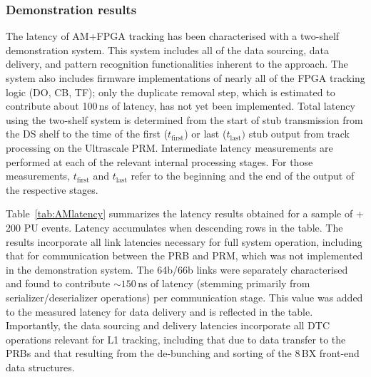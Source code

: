 \subsubsection{Demonstration results}
\label{sec:Part2_Chapter4_TrackTrigger-AM_demoresults}
The latency of AM+FPGA tracking has been characterised with a two-shelf demonstration system. This system includes all of the data sourcing, data delivery, and pattern recognition functionalities inherent to the approach. The system also includes firmware implementations of nearly all of the FPGA tracking logic (DO, CB, TF); only the duplicate removal step, which is estimated to contribute about 100\,ns of latency, has not yet been implemented. Total latency using the two-shelf system is determined from the start of stub transmission from the DS shelf to the time of the first ($t_{\text{first}}$) or last ($t_{\text{last}})$ stub output from track processing on the Ultrascale PRM. Intermediate latency measurements are performed at each of the relevant internal processing stages. For those measurements, $t_{\text{first}}$ and $t_{\text{last}}$ refer to the beginning and the end of the output of the respective stages. 

Table~\ref{tab:AMlatency} summarizes the latency results obtained for a sample of \ttbar + 200 PU events. Latency accumulates when descending rows in the table. The results incorporate all link latencies necessary for full system operation, including that for communication between the PRB and PRM, which was not implemented in the demonstration system. The 64b/66b links were separately characterised and found to contribute $\sim 150$\,ns of latency (stemming primarily from serializer/deserializer operations) per communication stage. This value was added to the measured latency for data delivery and is reflected in the table. Importantly, the data sourcing and delivery latencies incorporate all DTC operations relevant for L1 tracking, including that due to data transfer to the PRBs and that resulting from the de-bunching and sorting of the 8\,BX front-end data structures.


